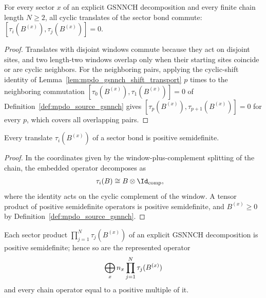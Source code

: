 \begin{lemma}
    \label{lem:mpdo_gsnnch_bond_translates_comm}
    \leanok
    For every sector $x$ of an explicit GSNNCH decomposition and every finite
    chain length $N\geq2$, all cyclic translates of the sector bond commute:
    $[\tau_i(B^{(x)}),\tau_j(B^{(x)})]=0$.
\end{lemma}

\begin{proof}\leanok
    Translates with disjoint windows commute because they act on disjoint
    sites, and two length-two windows overlap only when their starting sites
    coincide or are cyclic neighbors. For the neighboring pairs, applying the
    cyclic-shift identity of Lemma~\ref{lem:mpdo_gsnnch_shift_transport} $p$
    times to the neighboring commutation
    $[\tau_0(B^{(x)}),\tau_1(B^{(x)})]=0$ of
    Definition~\ref{def:mpdo_source_gsnnch} gives
    $[\tau_p(B^{(x)}),\tau_{p+1}(B^{(x)})]=0$ for every $p$, which covers all
    overlapping pairs.
\end{proof}

\begin{lemma}
    \label{lem:mpdo_gsnnch_translate_pos}
    \leanok
    Every translate $\tau_i(B^{(x)})$ of a sector bond is positive
    semidefinite.
\end{lemma}

\begin{proof}\leanok
    In the coordinates given by the window-plus-complement splitting of the
    chain, the embedded operator decomposes as
    \begin{align}
        \tau_i(B)
         & \cong B\otimes\Id_{\mathrm{comp}},
        \notag
    \end{align}
    where the identity acts on the cyclic complement of the window. A tensor
    product of positive semidefinite operators is positive semidefinite, and
    $B^{(x)}\geq0$ by Definition~\ref{def:mpdo_source_gsnnch}.
\end{proof}

\begin{lemma}
    \label{lem:mpdo_gsnnch_sector_sum_pos}
    \leanok
    Each sector product $\prod_{j=1}^N\tau_j(B^{(x)})$ of an explicit GSNNCH
    decomposition is positive semidefinite; hence so are the represented
    operator
    \begin{align}
        \bigoplus_x n_x \prod_{j=1}^N\tau_j(B^{(x)})
        \notag
    \end{align}
    and every chain operator equal to a positive multiple of it.
\end{lemma}

